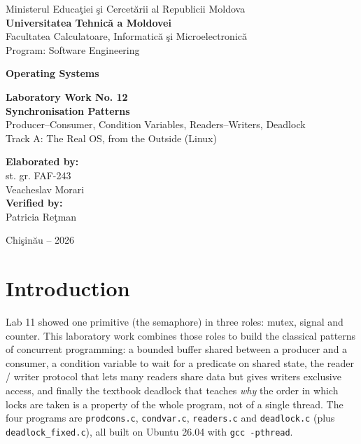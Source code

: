 \documentclass[12pt,a4paper]{article}
\begin{document}
\begin{titlepage}
    \centering
    Ministerul Educa\c{t}iei \c{s}i Cercet\u{a}rii al Republicii Moldova\\[0.4cm]
    \textbf{Universitatea Tehnic\u{a} a Moldovei}\\[0.4cm]
    Facultatea Calculatoare, Informatic\u{a} \c{s}i Microelectronic\u{a}\\[0.2cm]
    Program: Software Engineering

    \vspace{3cm}

    {\LARGE \textbf{Operating Systems}}

    \vspace{1.2cm}

    {\Large \textbf{Laboratory Work No. 12}}\\[0.6cm]
    {\LARGE \textbf{Synchronisation Patterns}}\\[0.3cm]
    Producer--Consumer, Condition Variables, Readers--Writers, Deadlock\\[0.3cm]
    Track A: The Real OS, from the Outside (Linux)

    \vspace{3cm}

    \begin{flushright}
        \textbf{Elaborated by:}\\
        st. gr. FAF-243\\
        Veacheslav Morari\\[0.6cm]
        \textbf{Verified by:}\\
        Patricia Re\c{t}man
    \end{flushright}

    \vfill
    Chi\c{s}in\u{a}u -- 2026
\end{titlepage}

\tableofcontents
\newpage

\section*{Introduction}

Lab 11 showed one primitive (the semaphore) in three roles: mutex, signal and counter. This laboratory work combines those roles to build the classical patterns of concurrent programming: a bounded buffer shared between a producer and a consumer, a condition variable to wait for a predicate on shared state, the reader / writer protocol that lets many readers share data but gives writers exclusive access, and finally the textbook deadlock that teaches \emph{why} the order in which locks are taken is a property of the whole program, not of a single thread. The four programs are \texttt{prodcons.c}, \texttt{condvar.c}, \texttt{readers.c} and \texttt{deadlock.c} (plus \texttt{deadlock\_fixed.c}), all built on Ubuntu 26.04 with \texttt{gcc -pthread}.
\end{document}
